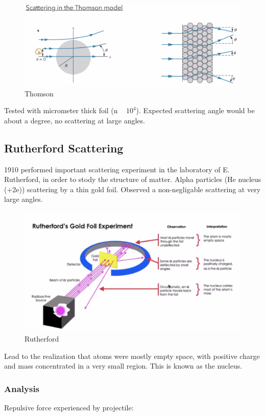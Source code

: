 \documentclass[class=article,crop=false]{standalone}
\begin{document}
\begin{figure}[h!]
	\centering
	\includegraphics[width=1\linewidth]{./Images/thomson.png}
	\caption{Thomson}
\end{figure}

Tested with micrometer thick foil (n ~ $10^4$). Expected scattering angle would be about a degree, no scattering at large angles. 

\subsection{Rutherford Scattering}
1910 performed important scattering experiment in the laboratory of E. Rutherford, in order to stody the structure of matter. Alpha particles (He nucleus (+2e)) scattering by a thin gold foil. Observed a non-negligable scattering at very large angles.

\begin{figure}[h!]
	\centering
	\includegraphics[width=1\linewidth]{./Images/rutherford.png}
	\caption{Rutherford}
\end{figure}

Lead to the realization that atoms were mostly empty space, with positive charge and mass concentrated in a very small region. This is known as the nucleus.

\subsubsection{Analysis}
Repulsive force experienced by projectile: 
\end{document}

